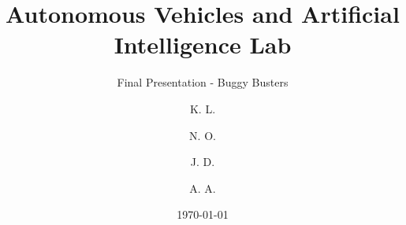 \documentclass{beamer}
\title{Autonomous Vehicles and Artificial Intelligence Lab}
\subtitle{Final Presentation - Buggy Busters}
\author{
	K. L.
	\and
	N. O.
	\and
	J. D.
	\and
	A. A.
}
\institute{Ruhr University Bochum}
\date{\today}
\begin{document}
\begin{frame}
	\titlepage
\end{frame}
\end{document}
